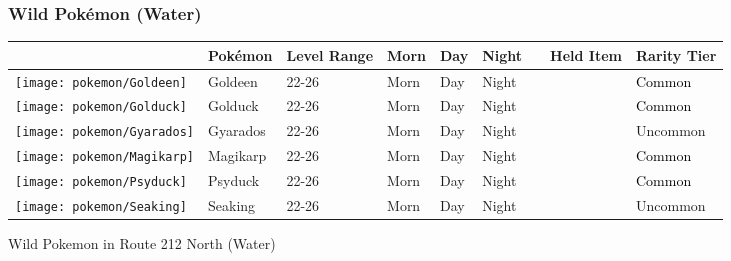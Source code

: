 \subsubsection{Wild Pokémon (Water)}%
\label{ssubsec:WildPokmon(Water)}%
\begin{longtable}{||l l l l l l l l l||}%
\hline%
\rowcolor{WaterColor}%
&Pokémon&Level Range&Morn&Day&Night&&Held Item&Rarity Tier\\%
\hline%
\endhead%
\hline%
\rowcolor{WaterColor}%
\texttt{[image: pokemon/Goldeen]}&Goldeen&22{-}26&Morn&Day&Night&&&\textcolor{black}{%
Common%
}\\%
\hline%
\rowcolor{WaterColor}%
\texttt{[image: pokemon/Golduck]}&Golduck&22{-}26&Morn&Day&Night&&&\textcolor{black}{%
Common%
}\\%
\hline%
\rowcolor{WaterColor}%
\texttt{[image: pokemon/Gyarados]}&Gyarados&22{-}26&Morn&Day&Night&&&\textcolor{OliveGreen}{%
Uncommon%
}\\%
\hline%
\rowcolor{WaterColor}%
\texttt{[image: pokemon/Magikarp]}&Magikarp&22{-}26&Morn&Day&Night&&&\textcolor{black}{%
Common%
}\\%
\hline%
\rowcolor{WaterColor}%
\texttt{[image: pokemon/Psyduck]}&Psyduck&22{-}26&Morn&Day&Night&&&\textcolor{black}{%
Common%
}\\%
\hline%
\rowcolor{WaterColor}%
\texttt{[image: pokemon/Seaking]}&Seaking&22{-}26&Morn&Day&Night&&&\textcolor{OliveGreen}{%
Uncommon%
}\\%
\hline%
\end{longtable}%
\caption{Wild Pokemon in Route 212 North (Water)}